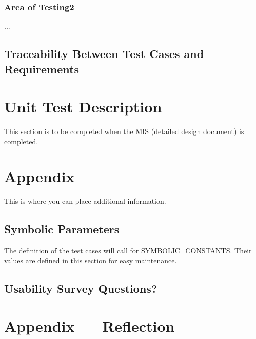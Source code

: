 \documentclass[12pt, titlepage]{article}
\begin{document}
\subsubsection{Area of Testing2}

...

\subsection{Traceability Between Test Cases and Requirements}


\section{Unit Test Description}

This section is to be completed when the MIS (detailed design document) is completed.

\section{Appendix}

This is where you can place additional information.

\subsection{Symbolic Parameters}

The definition of the test cases will call for SYMBOLIC\_CONSTANTS.
Their values are defined in this section for easy maintenance.

\subsection{Usability Survey Questions?}


\newpage{}
\section*{Appendix --- Reflection}
\end{document}
